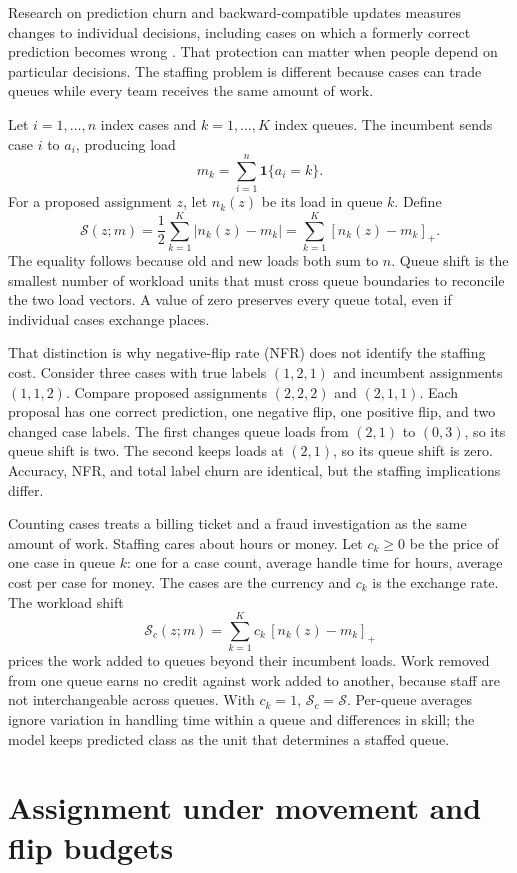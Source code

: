\documentclass[11pt]{article}
\newcommand{\shift}{\mathcal{S}}
\begin{document}
Research on prediction churn and backward-compatible updates measures changes to individual
decisions, including cases on which a formerly correct prediction becomes wrong
\citep{fard2016launch,bansal2019updates,srivastava2020empirical,traeuble2021backward,jiang2022churn}.
That protection can matter when people depend on particular decisions. The staffing problem is
different because cases can trade queues while every team receives the same amount of work.

Let $i=1,\ldots,n$ index cases and $k=1,\ldots,K$ index queues. The incumbent sends case $i$ to
$a_i$, producing load
\[
  m_k=\sum_{i=1}^n \mathbf{1}\{a_i=k\}.
\]
For a proposed assignment $z$, let $n_k(z)$ be its load in queue $k$. Define
\[
  \shift(z;m)
  =\frac{1}{2}\sum_{k=1}^K |n_k(z)-m_k|
  =\sum_{k=1}^K [n_k(z)-m_k]_+.
\]
The equality follows because old and new loads both sum to $n$. Queue shift is the smallest number
of workload units that must cross queue boundaries to reconcile the two load vectors. A value of
zero preserves every queue total, even if individual cases exchange places.

That distinction is why negative-flip rate (NFR) does not identify the staffing cost. Consider
three cases with true labels $(1,2,1)$ and incumbent assignments $(1,1,2)$. Compare proposed
assignments $(2,2,2)$ and $(2,1,1)$. Each proposal has one correct prediction, one negative flip,
one positive flip, and two changed case labels. The first changes queue loads from $(2,1)$ to
$(0,3)$, so its queue shift is two. The second keeps loads at $(2,1)$, so its queue shift is zero.
Accuracy, NFR, and total label churn are identical, but the staffing implications differ.

Counting cases treats a billing ticket and a fraud investigation as the same amount of work.
Staffing cares about hours or money. Let $c_k\geq 0$ be the price of one case in queue $k$: one for
a case count, average handle time for hours, average cost per case for money. The cases are the
currency and $c_k$ is the exchange rate. The workload shift
\[
  \shift_c(z;m)=\sum_{k=1}^K c_k\,[n_k(z)-m_k]_+
\]
prices the work added to queues beyond their incumbent loads. Work removed from one queue earns no
credit against work added to another, because staff are not interchangeable across queues. With
$c_k=1$, $\shift_c=\shift$. Per-queue averages ignore variation in handling time within a queue
and differences in skill; the model keeps predicted class as the unit that determines a staffed
queue.

\section{Assignment under movement and flip budgets}
\end{document}
